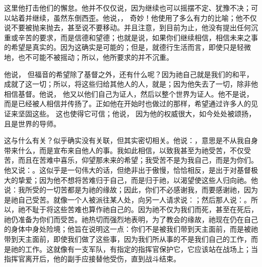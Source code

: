  \par

这里他打击他们的懈怠。他并不仅仅说，因为继续也可以摇摆不定、犹豫不决；可以站着并继续，虽然东倒西歪。他说，， 奇妙！他使用了多么有力的比喻；他不仅说不要被抛来抛去，甚至说不要移动。并且注意，到目前为止，他没有提出任何沉重或辛苦的要求，而是信德和望德；也就是说，如果你们继续相信，相信未来之事的希望是真实的。因为这确实是可能的；但是，就德行生活而言，即使只是轻微地，也不可能不被摇动；所以，他所要求的并不沉重。\par

他说， 但福音的希望除了基督之外，还有什么呢？因为祂自己就是我们的和平，成就了这一切；所以，将这些归给其他人的人，就是；因为他失去了一切，除非他相信基督。他说， 他又以他们自己为证人，然后以整个世界为证人。他不是说，而是已经被人相信并传扬了。正如他在开始时也做过的那样，希望通过许多人的见证来坚固这些。 这也使得它可信；他说， 因为他的权威很大，如今处处被颂扬，且是世界的导师。\par

 \par

这与什么有关？似乎确实没有关联，但其实密切相关。他说：，意思是不从我自身带来什么，而是宣布来自他人的事。我如此相信，以致我甚至为祂受苦，不仅受苦，而且在苦难中喜乐，仰望那未来的希望；我受苦不是为我自己，而是为你们。他又说：。这似乎是一句伟大的话，但绝非出于傲慢，恰恰相反，是出于对基督极大的挚爱；因为他不想将苦难归于自己，而是归于祂，以渴望使这些人归向祂。他说：我所受的一切苦都是为祂的缘故；因此，你们不必感谢我，而要感谢祂，因为是祂自己受苦。就像一个人被派往某人处，向另一人请求说：；然后那人说：。所以，祂不耻于将这些苦难也算作祂自己的。因为祂不仅为我们而死，甚至在死后，祂仍准备为你们而受苦。祂热切而强烈地表明，为了教会的缘故，祂现在仍在自己的身体中身处险境；他旨在说明这一点：你们不是被我们带到天主面前，而是被祂带到天主面前，即使我们做了这些事，因为我们所从事的不是我们自己的工作，而是祂的工作。这就像有一支军队，有指定的指挥官保护它，它应该站在战场上；当指挥官离开后，他的副手应接替他受伤，直到战斗结束。\par

